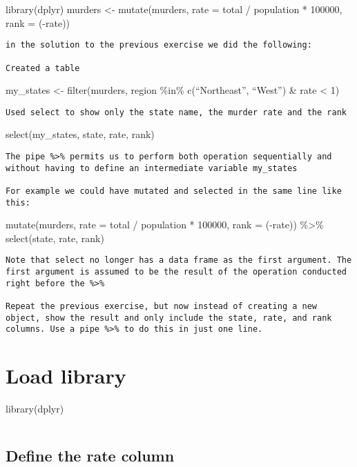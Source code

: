 \documentclass[
]{article}
\begin{document}
library(dplyr) murders \textless- mutate(murders, rate = total /
population * 100000, rank = (-rate))

\begin{verbatim}
in the solution to the previous exercise we did the following:

Created a table
\end{verbatim}

my\_states \textless- filter(murders, region \%in\% c(``Northeast'',
``West'') \& rate \textless{} 1)

\begin{verbatim}
Used select to show only the state name, the murder rate and the rank
\end{verbatim}

select(my\_states, state, rate, rank)

\begin{verbatim}
The pipe %>% permits us to perform both operation sequentially and without having to define an intermediate variable my_states

For example we could have mutated and selected in the same line like this:
\end{verbatim}

mutate(murders, rate = total / population * 100000, rank = (-rate))
\%\textgreater\% select(state, rate, rank)

\begin{verbatim}
Note that select no longer has a data frame as the first argument. The first argument is assumed to be the result of the operation conducted right before the %>%

Repeat the previous exercise, but now instead of creating a new object, show the result and only include the state, rate, and rank columns. Use a pipe %>% to do this in just one line.
\end{verbatim}

\hypertarget{load-library}{%
\section{Load library}\label{load-library}}

library(dplyr)

\begin{verbatim}
\end{verbatim}

\hypertarget{define-the-rate-column}{%
\subsection{Define the rate column}\label{define-the-rate-column}}
\end{document}
